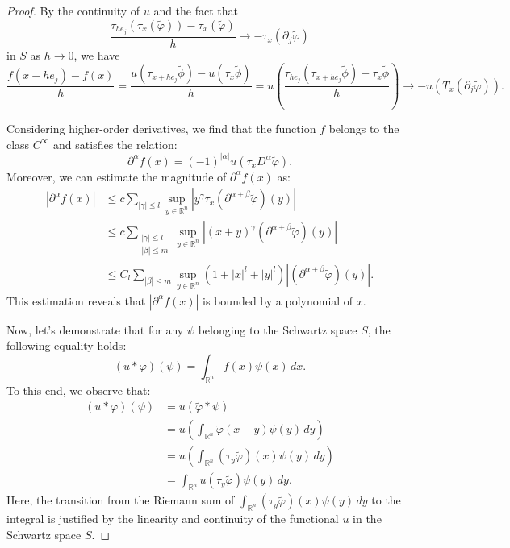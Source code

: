 \begin{proof}
By the continuity of $u$ and the fact that
$$
\frac{\tau_{h e_j}(\tau_x(\tilde{\varphi})) - \tau_x(\tilde{\varphi})}{h} \rightarrow -\tau_x(\partial_j \tilde{\varphi})
$$
in $S$ as $h \rightarrow 0$, we have
    $$
    \frac{f(x+he_j)-f(x)}{h}=\frac{u(\tau_{x+he_j} \tilde{\phi})-u(\tau_x \tilde{\phi})}{h}=u(\frac{\tau_{he_j}( \tau_{x+he_j}\tilde{\phi})-\tau_x \tilde{\phi}}{h}) \rightarrow -u(T_x(\partial_j \tilde{\varphi})).
    $$

Considering higher-order derivatives, we find that the function $f$ belongs to the class $C^{\infty}$ and satisfies the relation:
$$
\partial^\alpha f(x) = (-1)^{|\alpha|} u(\tau_x D^\alpha \tilde{\varphi}).
$$
Moreover, we can estimate the magnitude of $\partial^\alpha f(x)$ as:
$$
\begin{aligned}
|\partial^\alpha f(x)| &\leq c \sum_{|\gamma| \leq l} \sup_{y \in \mathbb{R}^n} |y^\gamma \tau_x(\partial^{\alpha+\beta} \tilde{\varphi})(y)| \\
&\leq c \sum_{\substack{|\gamma| \leq l \\ |\beta| \leq m}} \sup_{y \in \mathbb{R}^n} |(x+y)^\gamma (\partial^{\alpha+\beta} \tilde{\varphi})(y)| \\
&\leq C_l \sum_{|\beta| \leq m} \sup_{y \in \mathbb{R}^n} (1 + |x|^l + |y|^l) |(\partial^{\alpha+\beta} \tilde{\varphi})(y)|.
\end{aligned}
$$
This estimation reveals that $|\partial^\alpha f(x)|$ is bounded by a polynomial of $x$.

Now, let's demonstrate that for any $\psi$ belonging to the Schwartz space $S$, the following equality holds:
$$
(u * \varphi)(\psi) = \int_{\mathbb{R}^n} f(x) \psi(x) \, dx.
$$
To this end, we observe that:
$$
\begin{aligned}
(u * \varphi)(\psi) &= u(\tilde{\varphi} * \psi) \\
&= u\left( \int_{\mathbb{R}^n} \tilde{\varphi}(x-y) \psi(y) \, dy \right) \\
&= u\left( \int_{\mathbb{R}^n} (\tau_y \tilde{\varphi})(x) \psi(y) \, dy \right) \\
&= \int_{\mathbb{R}^n} u(\tau_y \tilde{\varphi}) \psi(y) \, dy.
\end{aligned}
$$
Here, the transition from the Riemann sum of $\int_{\mathbb{R}^n} (\tau_y \tilde{\varphi})(x) \psi(y) \, dy$ to the integral is justified by the linearity and continuity of the functional $u$ in the Schwartz space $S$.
\end{proof}